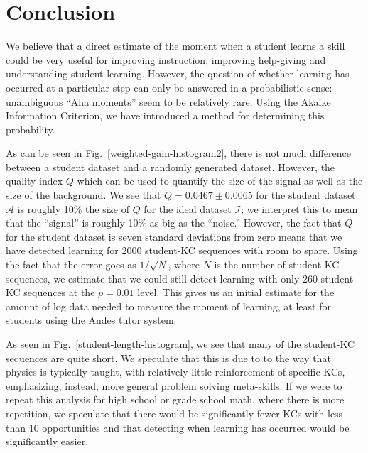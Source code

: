 \documentclass{acmlarge-edm}
\begin{document}
\section{Conclusion}

We believe that a direct estimate of the moment when a student
learns a skill could be very useful for improving instruction,
improving help-giving and understanding student learning.
However, the question of whether learning has occurred at a particular
step can only be answered in a probabilistic sense:
unambiguous ``Aha moments'' seem to be relatively rare.
Using the Akaike Information Criterion, we have introduced a method
for determining this probability.



As can be seen in
Fig.~\ref{weighted-gain-histogram2}, there is not much difference
between a student dataset and a randomly generated dataset.  However,
the quality index $Q$ which can be used to quantify the
size of the signal as well as the size of the background.  We see that
$Q=0.0467\pm0.0065$ for the student dataset $\mathcal{A}$ is roughly
10\% the size of $Q$ for the ideal dataset $\mathcal{I}$; we interpret
this to mean that the ``signal'' is roughly 10\% as big as the
``noise.''  However, the fact that $Q$ for the student dataset is
seven standard deviations from zero means that we have detected
learning for 2000 student-KC sequences with room to spare.  Using the fact
that the error goes as $1/\sqrt{N}$, where $N$ is the number 
of student-KC sequences, we estimate
that we could still detect learning with only 260 student-KC sequences at the
$p=0.01$ level.  This gives us an initial estimate for the amount of
log data needed to measure the moment of learning, at least for
students using the Andes tutor system.

As seen in Fig.~\ref{student-length-histogram}, we see that many of
the student-KC sequences are quite short.  We speculate that this
is due to to the way that physics is typically taught, with relatively
little reinforcement of specific KCs, emphasizing, instead, more
general problem solving meta-skills.  If we were to repeat this
analysis for high school or grade school math, where there is more
repetition, we speculate that there would be significantly fewer KCs
with less than 10 opportunities and that detecting when learning has
occurred would be significantly easier.




\end{document}
